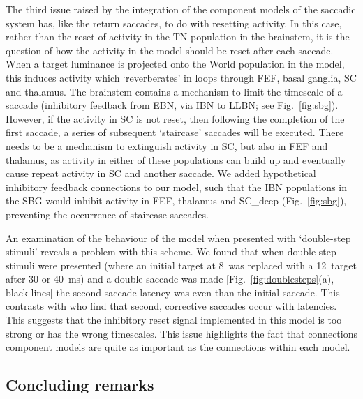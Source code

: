\documentclass{frontiersSCNS}
\begin{document}
The third issue raised by the integration of the component models of
the saccadic system has, like the return saccades, to do with resetting
activity. In this case, rather than the reset of activity in the TN
population in the brainstem, it is the question of how the activity
in the  model should be reset after each saccade. When a target
luminance is projected onto the World population in the model, this
induces activity which `reverberates' in loops through FEF, basal
ganglia, SC and thalamus. The brainstem contains a mechanism to limit
the timescale of a saccade (inhibitory feedback from EBN, via IBN to
LLBN; see Fig.~\ref{fig:sbg}). However, if the activity in SC is not
reset, then following the completion of the first saccade, a series
of subsequent `staircase' saccades will be executed. There needs to
be a mechanism to extinguish activity in SC, but also in FEF and
thalamus, as activity in either of these populations can build up
and eventually cause repeat activity in SC and another saccade. We
added hypothetical inhibitory feedback connections to our model,
such that the IBN populations in the SBG would inhibit activity in
FEF, thalamus and SC\_deep (Fig.~\ref{fig:sbg}), preventing the
occurrence of staircase saccades.

An examination of the behaviour of the model when presented with
`double-step stimuli' reveals a problem with this scheme. We found
that when double-step stimuli were presented (where an initial
target at 8\dg~was replaced with a 12\dg~target after 30 or 40~ms)
and a double saccade was made [Fig.~\ref{fig:doublesteps}(a), black
lines] the second saccade latency was  even than the
initial saccade. This contrasts with \cite{becker_analysis_1979} who
find that second, corrective saccades occur with  latencies.
This suggests that the inhibitory reset signal implemented in
this model is too strong or has the wrong timescales. This issue
highlights the fact that connections  component models
are quite as important as the connections within each model.

\subsection{Concluding remarks}
\end{document}
